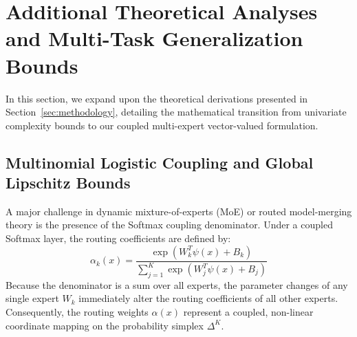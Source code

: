 \documentclass{article}
\theoremstyle{plain}
\theoremstyle{definition}
\theoremstyle{remark}
\begin{document}










\newpage
\appendix
\onecolumn

\section{Additional Theoretical Analyses and Multi-Task Generalization Bounds}
\label{app:theory}

In this section, we expand upon the theoretical derivations presented in Section~\ref{sec:methodology}, detailing the mathematical transition from univariate complexity bounds to our coupled multi-expert vector-valued formulation.

\subsection{Multinomial Logistic Coupling and Global Lipschitz Bounds}
A major challenge in dynamic mixture-of-experts (MoE) or routed model-merging theory is the presence of the Softmax coupling denominator. Under a coupled Softmax layer, the routing coefficients are defined by:
\begin{equation}
    \alpha_k(x) = \frac{\exp(W_k^T \psi(x) + B_k)}{\sum_{j=1}^K \exp(W_j^T \psi(x) + B_j)}
\end{equation}
Because the denominator is a sum over all experts, the parameter changes of any single expert $W_k$ immediately alter the routing coefficients of all other experts. Consequently, the routing weights $\alpha(x)$ represent a coupled, non-linear coordinate mapping on the probability simplex $\Delta^K$.
\end{document}
